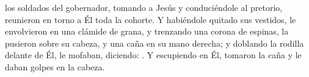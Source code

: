  los soldados del gobernador, tomando a Jesús y conduciéndole al pretorio, reunieron en torno a Él toda la cohorte. 
Y habiéndole quitado sus vestidos, le envolvieron en una clámide de grana, y trenzando una corona de espinas, la pusieron sobre su cabeza, 
y una caña en su mano derecha; y doblando la rodilla delante de Él, le mofaban, diciendo: . Y escupiendo en Él, 
tomaron la caña y le daban golpes en la cabeza. 